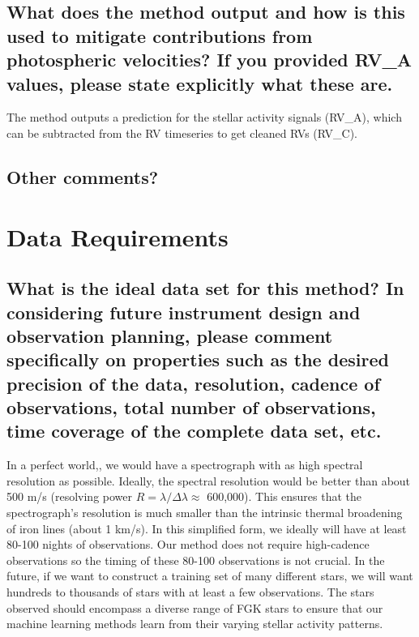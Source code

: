 \documentclass[12pt]{article}
\begin{document}
\subsection{What does the method output and how is this used to mitigate contributions from photospheric velocities?  If you provided RV\_A values, please state explicitly what these are.}

The method outputs a prediction for the stellar activity signals (RV\_A), which can be subtracted from the RV timeseries to get cleaned RVs (RV\_C).

\subsection{Other comments?}



\section{Data Requirements}
\subsection{What is the ideal data set for this method?  In considering future instrument design and observation planning, please comment specifically on properties such as the desired precision of the data, resolution, cadence of observations, total number of observations, time coverage of the complete data set, etc.}

In a perfect world,, we would have a spectrograph with as high spectral resolution as possible. Ideally, the spectral resolution would be better than about 500 m/s (resolving power $R =\lambda/\Delta\lambda\approx$ 600,000). This ensures that the spectrograph's resolution is much smaller than the intrinsic thermal broadening of iron lines (about 1 km/s). In this simplified form, we ideally will have at least 80-100 nights of observations. Our method does not require high-cadence observations so the timing of these 80-100 observations is not crucial. In the future, if we want to construct a training set of many different stars, we will want hundreds to thousands of stars with at least a few observations. The stars observed should encompass a diverse range of FGK stars to ensure that our machine learning methods learn from their varying stellar activity patterns. 

\end{document}
